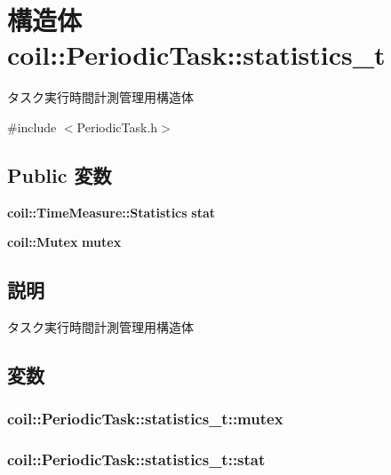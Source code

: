\section{構造体 coil::PeriodicTask::statistics\_\-t}
\label{structcoil_1_1PeriodicTask_1_1statistics__t}


タスク実行時間計測管理用構造体  




{\ttfamily \#include $<$PeriodicTask.h$>$}

\subsection*{Public 変数}
\begin{DoxyCompactItemize}
\item 
{\bf coil::TimeMeasure::Statistics} {\bf stat}
\item 
{\bf coil::Mutex} {\bf mutex}
\end{DoxyCompactItemize}


\subsection{説明}
タスク実行時間計測管理用構造体 

\subsection{変数}
\subsubsection[{mutex}]{ {\bf coil::PeriodicTask::statistics\_\-t::mutex}}\label{structcoil_1_1PeriodicTask_1_1statistics__t_afd06764a2da24b4a0900a9c8ff3d7127}
\subsubsection[{stat}]{ {\bf coil::PeriodicTask::statistics\_\-t::stat}}\label{structcoil_1_1PeriodicTask_1_1statistics__t_a43ec579612e368cd676e60558a8a9977}

